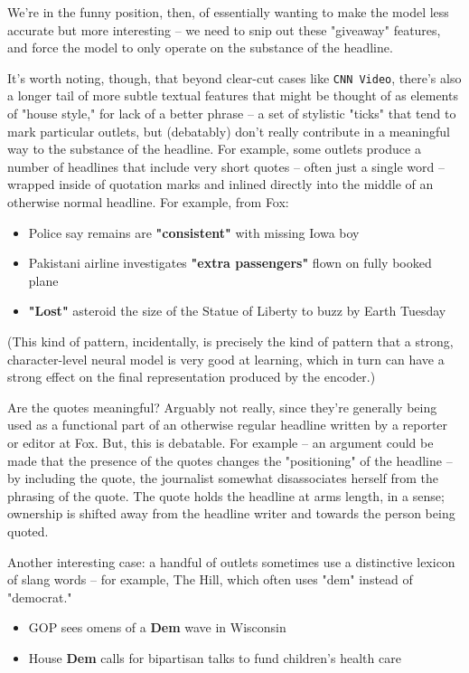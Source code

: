 \documentclass{scrartcl}
\begin{document}
We're in the funny position, then, of essentially wanting to make the model less accurate but more interesting -- we need to snip out these "giveaway" features, and force the model to only operate on the substance of the headline.

It's worth noting, though, that beyond clear-cut cases like \texttt{CNN Video}, there's also a longer tail of more subtle textual features that might be thought of as elements of "house style," for lack of a better phrase -- a set of stylistic "ticks" that tend to mark particular outlets, but (debatably) don't really contribute in a meaningful way to the substance of the headline. For example, some outlets produce a number of headlines that include very short quotes -- often just a single word -- wrapped inside of quotation marks and inlined directly into the middle of an otherwise normal headline. For example, from Fox:

\begin{itemize}
\item Police say remains are \textbf{"consistent"} with missing Iowa boy
\item Pakistani airline investigates \textbf{"extra passengers"} flown on fully booked plane
\item \textbf{"Lost"} asteroid the size of the Statue of Liberty to buzz by Earth Tuesday
\end{itemize}

(This kind of pattern, incidentally, is precisely the kind of pattern that a strong, character-level neural model is very good at learning, which in turn can have a strong effect on the final representation produced by the encoder.)

Are the quotes meaningful? Arguably not really, since they're generally being used as a functional part of an otherwise regular headline written by a reporter or editor at Fox. But, this is debatable. For example -- an argument could be made that the presence of the quotes changes the "positioning" of the headline -- by including the quote, the journalist somewhat disassociates herself from the phrasing of the quote. The quote holds the headline at arms length, in a sense; ownership is shifted away from the headline writer and towards the person being quoted.

Another interesting case: a handful of outlets sometimes use a distinctive lexicon of slang words -- for example, The Hill, which often uses "dem" instead of "democrat."

\begin{itemize}
\item GOP sees omens of a \textbf{Dem} wave in Wisconsin
\item House \textbf{Dem} calls for bipartisan talks to fund children's health care
\end{itemize}
\end{document}
